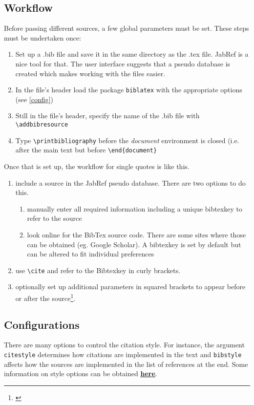 \documentclass[a4paper]{scrartcl}
\begin{document}
	\subsection{Workflow}
	
	Before passing different sources, a few global parameters must be set. These steps must be undertaken once:
	
	\begin{enumerate}
		\item Set up a .bib file and save it in the same directory as the .tex file. JabRef is a nice tool for that. The user interface suggests that a pseudo database is created which makes working with the files easier.
		\item In the file's header load the package \texttt{biblatex} with the appropriate options (see \autoref{config})
		\item Still in the file's header, specify the name of the .bib file with \texttt{\textbackslash addbibresource}
		\item Type \texttt{\textbackslash printbibliography} before the \emph{document} environment is closed (i.e. after the main text but before \texttt{\textbackslash end\{document\} }
	\end{enumerate}
	
	Once that is set up, the workflow for single quotes is like this.
	\begin{enumerate}
		\item include a source in the JabRef pseudo database. There are two options to do this.
			\begin{enumerate}
				\item manually enter all required information including a unique bibtexkey to refer to the source
				\item look online for the BibTex source code. There are some sites where those can be obtained (eg. Google Scholar). A bibtexkey is set by default but can be altered  to fit individual preferences
			\end{enumerate}
		\item use \texttt{\textbackslash cite} and refer to the Bibtexkey in curly brackets.
		\item optionally set up additional parameters in squared brackets to appear before or after the source\footnote{\cite[see][p. 12]{grapov2018rise}}.
	\end{enumerate}

\subsection{Configurations}\label{config}
	There are many options to control the citation style. For instance, the argument \texttt{citestyle} determines how citations are implemented in the text and \texttt{bibstyle} affects how the sources are implemented in the list of references at the end. Some information on style options can be obtained \href{https://www.overleaf.com/learn/latex/Biblatex_citation_styles}{\textbf{\color{blue}here}}.
	
\end{document}
